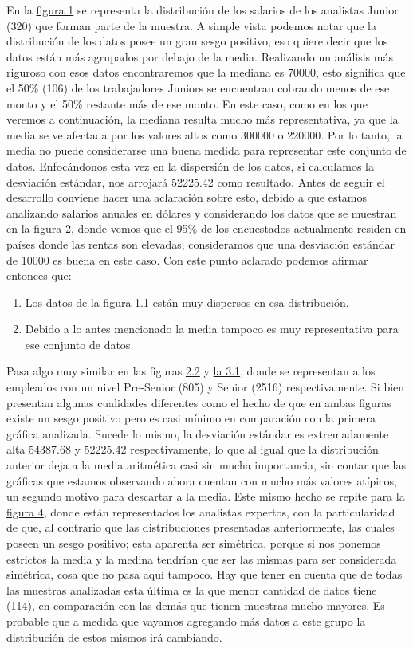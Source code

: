 \documentclass{article}
\begin{document}
	En la \hyperref[figura 1.1 diagrama]{figura 1} se representa la distribución de los salarios de los analistas Junior (320) que forman parte de la muestra. A simple vista podemos notar que la distribución de los datos posee un gran sesgo positivo, eso quiere decir que los datos están más agrupados por debajo de la media.
	Realizando un análisis más riguroso con esos datos encontraremos que la mediana es 70000, esto significa que el 50\% (106) de los trabajadores Juniors se encuentran cobrando menos de ese monto y el 50\% restante más de ese monto. En este caso, como en los que veremos a continuación, la mediana resulta mucho más representativa, ya que la media se ve afectada por los valores altos como 300000 o 220000. Por lo tanto, la media no puede considerarse una buena medida para representar este conjunto de datos.
	Enfocándonos esta vez en la dispersión de los datos, si calculamos la desviación estándar, nos arrojará 52225.42 como resultado. Antes de seguir el desarrollo conviene hacer una aclaración sobre esto, debido a que estamos analizando salarios anuales en dólares y considerando los datos que se muestran en la \hyperref[figura 2 torta]{figura 2}, donde vemos que el 95\% de los encuestados actualmente residen en países donde las rentas son elevadas, consideramos que una desviación estándar de 10000 es buena en este caso.
	Con este punto aclarado podemos afirmar entonces que: 
	\begin{enumerate}
		\item Los datos de la \hyperref[figura 1.1 diagrama]{figura 1.1} están muy dispersos en esa distribución.
		\item Debido a lo antes mencionado la media tampoco es muy representativa para ese conjunto de datos.
	\end{enumerate}
Pasa algo muy similar en las figuras \hyperref[figura 2.2 diagrama]{2.2} y \hyperref[figura 3.1 diagrama]{la 3.1}, donde se representan a los empleados con un nivel Pre-Senior (805) y Senior (2516) respectivamente. Si bien presentan algunas cualidades diferentes como el hecho de que en ambas figuras existe un sesgo positivo pero es casi mínimo en comparación con la primera gráfica analizada. Sucede lo mismo, la desviación estándar es extremadamente alta 54387.68 y 52225.42 respectivamente, lo que al igual que la distribución anterior deja a la media aritmética casi sin mucha importancia, sin contar que las gráficas que estamos observando ahora cuentan con mucho más valores atípicos, un segundo motivo para descartar a la media. Este mismo hecho se repite para la \hyperref[figura 4.1 diagrama]{figura 4}, donde están representados los analistas expertos, con la particularidad de que, al contrario que las distribuciones presentadas anteriormente, las cuales poseen un sesgo positivo; esta aparenta ser simétrica, porque si nos ponemos estrictos la media y la medina tendrían que ser las mismas para ser considerada simétrica, cosa que no pasa aquí tampoco. Hay que tener en cuenta que de todas las muestras analizadas esta última es la que menor cantidad de datos tiene (114), en comparación con las demás que tienen muestras mucho mayores. Es probable que a medida que vayamos agregando más datos a este grupo la distribución de estos mismos irá cambiando.
\end{document}
